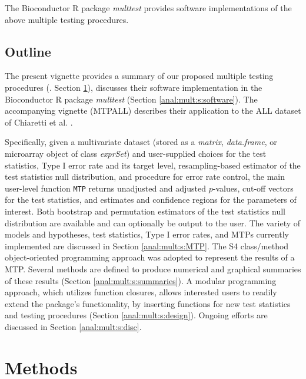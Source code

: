 \documentclass[11pt]{article}
\newcommand{\Rpackage}[1]{\textit{#1}}
\newcommand{\Robject}[1]{\texttt{#1}}
\newcommand{\Rclass}[1]{\textit{#1}}
\begin{document}
The Bioconductor R package \Rpackage{multtest} provides software implementations of the above multiple testing procedures. 

\subsection{Outline}

The present vignette provides a summary of our proposed multiple testing procedures (\cite{Dudoit&vdLaanMTBook,DudoitetalMT1SAGMB04,vdLaanetalMT2SAGMB04,vdLaanetalMT3SAGMB04,Pollard&vdLaanJSPI04}. Section \ref{anal:mult:s:methods}), 
discusses their software implementation in the Bioconductor R package \Rpackage{multtest} (Section \ref{anal:mult:s:software}). 
The accompanying vignette (MTPALL) describes their application to the ALL dataset of Chiaretti et al. \cite{Chiarettietal04}.

Specifically, given a multivariate dataset (stored as a \Rclass{matrix}, \Rclass{data.frame}, or microarray object of class \Rclass{exprSet}) 
and user-supplied choices for the test statistics, Type I error rate and its target level, resampling-based estimator of the test statistics null distribution, and procedure for error rate control, the main user-level function \Robject{MTP} returns unadjusted and adjusted $p$-values, cut-off vectors for the test statistics, and estimates and confidence regions for the parameters of interest. 
Both bootstrap and permutation estimators of the test statistics null distribution are available and can optionally be output to the user. 
The variety of models and hypotheses, test statistics, Type I error rates, and MTPs currently implemented are discussed in Section \ref{anal:mult:s:MTP}.
The S4 class/method object-oriented programming approach was adopted to represent the results of a MTP. 
Several methods are defined to produce numerical and graphical summaries of these results (Section \ref{anal:mult:s:summaries}).
A modular programming approach, which utilizes function closures, allows interested users to readily extend the package's functionality, 
by inserting functions for new test statistics and testing procedures (Section \ref{anal:mult:s:design}).
Ongoing efforts are discussed in Section \ref{anal:mult:s:disc}.

\section{Methods}
\label{anal:mult:s:methods}
\end{document}
